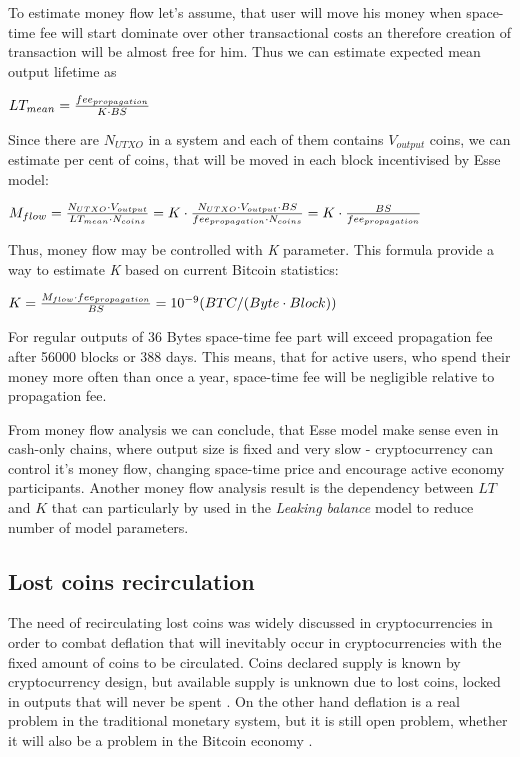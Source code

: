 \documentclass[]{article}   %
\newcommand{\authnote}[2]{\marginpar{\parbox{\marginparwidth}{\tiny %
  \textsf{#1 {\textcolor{blue}{notes: #2}}}}}%
  \textcolor{blue}{\textbf{\dag}}}
\newcommand{\authnote}[2]{
  \textsf{#1 \textcolor{blue}{: #2}}}
\newcommand{\authnote}[2]{}
\newcommand{\dnote}[1]{{\authnote{\textcolor{blue}{Dima notes}}{#1}}}
\newcommand{\esse}{Esse}
\begin{document}
To estimate money flow let's assume, that user will move his money when space-time fee will start dominate over other transactional costs an therefore creation of transaction will be almost free for him. Thus we can estimate expected mean output lifetime as

$LT_{mean}={fee_{propagation} \over K \cdot BS}$

Since there are $N_{UTXO}$ in a system and each of them contains $V_{output}$ coins, we can estimate per cent of coins, that will be moved in each block incentivised by \esse{} model:

$M_{flow}={N_{UTXO} \cdot V_{output} \over LT_{mean} \cdot N_{coins}}=K \cdot {N_{UTXO} \cdot V_{output} \cdot BS \over fee_{propagation} \cdot N_{coins}} = K \cdot {BS \over fee_{propagation}}$

Thus, money flow may be controlled with \textit{K} parameter. This formula provide a way to estimate \textit{K} based on current Bitcoin statistics:

$K={M_{flow} \cdot fee_{propagation} \over BS} = {10^{-9}}{(BTC / (Byte \cdot Block))} $

For regular outputs of 36 Bytes space-time fee part will exceed propagation fee after 56000 blocks or 388 days. This means, that for active users, who spend their money more often than once a year, space-time fee will be negligible relative to propagation fee.

From money flow analysis we can conclude, that \esse{} model make sense even in cash-only chains, where output size is fixed and very slow - cryptocurrency can control it's money flow, changing space-time price and encourage active economy participants. Another money flow analysis result is the dependency between $LT$ and $K$ \dnote{link to formula $LT={fee_{propagation} \over K \cdot BS}$} that can particularly by used in the \textit{Leaking balance} model to reduce number of model parameters.


\subsection{Lost coins recirculation}

The need of recirculating lost coins was widely discussed in cryptocurrencies \cite{gjermundrod2014recirculating, gjermundrod2016going} in order to combat deflation that will inevitably occur in cryptocurrencies with the fixed amount of coins to be circulated. Coins declared supply is known by cryptocurrency design, but available supply is unknown due to lost coins, locked in outputs that will never be spent \cite{ron2013quantitative}. On the other hand deflation is a real problem in the traditional monetary system, but it is still open problem, whether it will also be a problem in the Bitcoin economy \cite{bitcoinDeflationarySpiral, barber2012bitter}.
\end{document}
